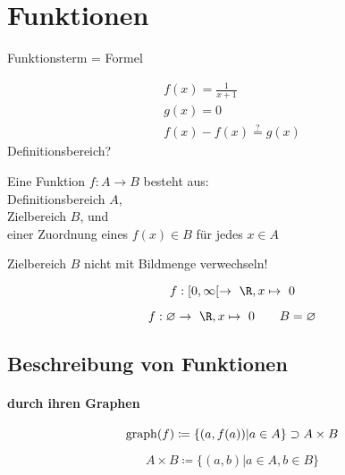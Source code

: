 \chapter{Funktionen}
Funktionsterm = Formel \\
\begin{bsp*}
	\begin{gather*}
		f(x) = \frac{1}{x+1} \\
		g(x) = 0 \\
		f(x) - f(x) \overset{?}{=} g(x)
	\end{gather*}
	Definitionsbereich?
\end{bsp*}\marginpar{$[a,b) = [a,b[$ halb-offenes Intervall\\\\ $\mapsto$ wird abgebildet auf\\\\ $\{\} = \varnothing$}
\begin{def*}[note = Funktion , index = Funktion]
	Eine Funktion $f: A \rightarrow B$ besteht aus: \\
	\qquad Definitionsbereich $A$, \\
	\qquad Zielbereich $B$, und \\
	\qquad einer Zuordnung eines $f(x) \in B$ für jedes $x \in A$
\end{def*}
\begin{bem}
	Zielbereich $B$ nicht mit Bildmenge verwechseln! \\
\end{bem}
\begin{bsp*}
	\[ f: [0,\infty [ \rightarrow \R , x \mapsto 0 \]
\end{bsp*}
\begin{bsp*}
	\[ f: \varnothing \rightarrow \R , x \mapsto 0 \qquad B = \varnothing \]
\end{bsp*}

\section{Beschreibung von Funktionen}
\subsubsection{durch ihren Graphen}
\begin{def*}[note = Graph , index = Graph]
	\[ \operatorname{graph}(f) \coloneqq \{ ( a , f(a) ) | a \in A \} \supset A \times B \]
\end{def*}
\begin{def*}[note = Kreuzmenge , index = Kreuzmenge]
	\[ A \times B \coloneqq \{ (a , b ) | a \in A , b \in B \} \]
\end{def*}

